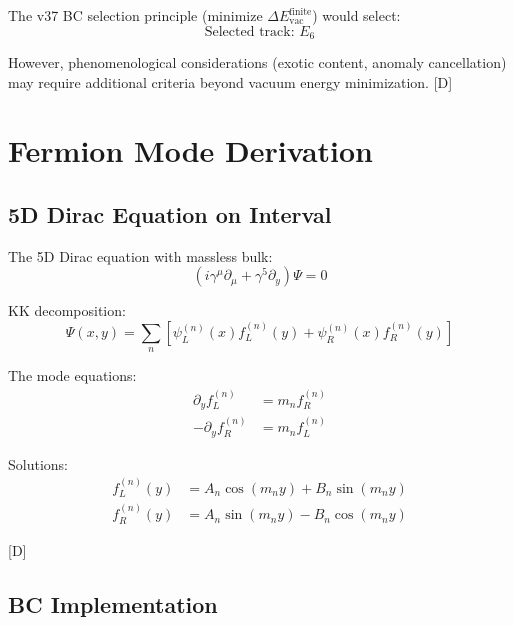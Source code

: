 \documentclass[11pt,a4paper]{article}
\newcommand{\tagD}{\textcolor{blue!70!black}{[D]}}
\begin{document}
The v37 BC selection principle (minimize $\Delta E_{\text{vac}}^{\text{finite}}$) would select:
\begin{equation}
\label{eq:selected-track}
\boxed{\text{Selected track: } E_6}
\end{equation}

However, phenomenological considerations (exotic content, anomaly cancellation) may
require additional criteria beyond vacuum energy minimization. \tagD

\appendix

\section{Fermion Mode Derivation}
\label{app:ferm-modes}

\subsection{5D Dirac Equation on Interval}

The 5D Dirac equation with massless bulk:
\begin{equation}
\label{eq:app-dirac}
(i\gamma^\mu \partial_\mu + \gamma^5 \partial_y) \Psi = 0
\end{equation}

KK decomposition:
\begin{equation}
\label{eq:app-kk-ferm}
\Psi(x, y) = \sum_n \left[\psi_L^{(n)}(x) f_L^{(n)}(y) + \psi_R^{(n)}(x) f_R^{(n)}(y)\right]
\end{equation}

The mode equations:
\begin{align}
\label{eq:app-mode-L}
\partial_y f_L^{(n)} &= m_n f_R^{(n)} \\
\label{eq:app-mode-R}
-\partial_y f_R^{(n)} &= m_n f_L^{(n)}
\end{align}

Solutions:
\begin{align}
\label{eq:app-fL}
f_L^{(n)}(y) &= A_n \cos(m_n y) + B_n \sin(m_n y) \\
\label{eq:app-fR}
f_R^{(n)}(y) &= A_n \sin(m_n y) - B_n \cos(m_n y)
\end{align}

\tagD

\subsection{BC Implementation}
\end{document}
